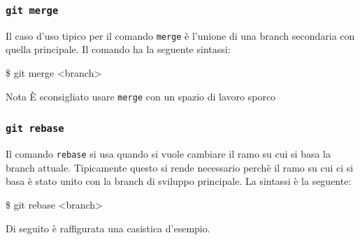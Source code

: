\documentclass{beamer}
\begin{document}
\begin{frame}
  \frametitle{\texttt{git merge}}
  Il caso d'uso tipico per il comando \texttt{merge} \`e l'unione di una branch
  secondaria con quella principale. Il comando ha la seguente sintassi:
  \begin{semiverbatim}
  \$ git merge <branch>
  \end{semiverbatim}

  \begin{figure}
  \end{figure}

  \pause
  \begin{block}{Nota}
    \`E sconsigliato usare \texttt{merge} con un spazio di lavoro sporco
  \end{block}
\end{frame}

\begin{frame}
  \frametitle{\texttt{git rebase}}
  Il comando \texttt{rebase} si usa quando si vuole cambiare il ramo su cui si
  basa la branch attuale. Tipicamente questo si rende necessario perch\`e il
  ramo su cui ci si basa \`e stato unito con la branch di sviluppo principale.
  La sintassi \`e la seguente:
  \begin{semiverbatim}
  \$ git rebase <branch>
  \end{semiverbatim}
  Di seguito \`e raffigurata una casistica d'esempio.

  \begin{figure}
  \end{figure}
\end{frame}
\end{document}
